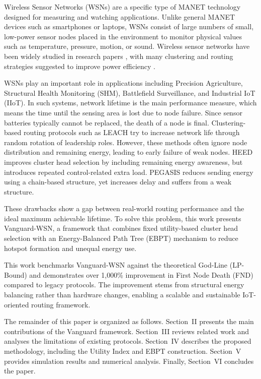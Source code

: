 \documentclass[conference]{IEEEtran}
\begin{document}
Wireless Sensor Networks (WSNs) are a specific type of MANET technology designed for measuring and watching applications. Unlike general MANET devices such as smartphones or laptops, WSNs consist of large numbers of small, low-power sensor nodes placed in the environment to monitor physical values such as temperature, pressure, motion, or sound. Wireless sensor networks have been widely studied in research papers \cite{b1,b2}, with many clustering and routing strategies suggested to improve power efficiency \cite{b3,b4}.

WSNs play an important role in applications including Precision Agriculture, Structural Health Monitoring (SHM), Battlefield Surveillance, and Industrial IoT (IIoT). In such systems, network lifetime is the main performance measure, which means the time until the sensing area is lost due to node failure. Since sensor batteries typically cannot be replaced, the death of a node is final. Clustering-based routing protocols such as LEACH \cite{b5} try to increase network life through random rotation of leadership roles. However, these methods often ignore node distribution and remaining energy, leading to early failure of weak nodes. HEED \cite{b7} improves cluster head selection by including remaining energy awareness, but introduces repeated control-related extra load. PEGASIS \cite{b8} reduces sending energy using a chain-based structure, yet increases delay and suffers from a weak structure.

These drawbacks show a gap between real-world routing performance and the ideal maximum achievable lifetime. To solve this problem, this work presents Vanguard-WSN, a framework that combines fixed utility-based cluster head selection with an Energy-Balanced Path Tree (EBPT) mechanism to reduce hotspot formation and unequal energy use.

This work benchmarks Vanguard-WSN against the theoretical God-Line (LP-Bound) and demonstrates over 1,000\% improvement in First Node Death (FND) compared to legacy protocols. The improvement stems from structural energy balancing rather than hardware changes, enabling a scalable and sustainable IoT-oriented routing framework.

The remainder of this paper is organized as follows. Section~II presents the main contributions of the Vanguard framework. Section~III reviews related work and analyses the limitations of existing protocols. Section~IV describes the proposed methodology, including the Utility Index and EBPT construction. Section~V provides simulation results and numerical analysis. Finally, Section~VI concludes the paper.
\end{document}
